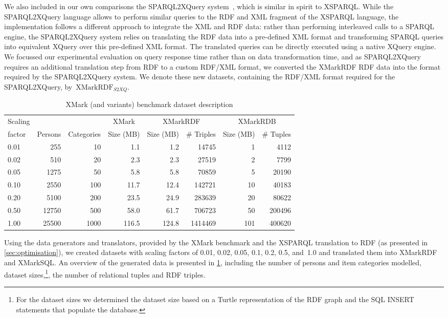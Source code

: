 We also included in our own comparisons the SPAR\-QL2\-XQuery system~\cite{GroppeGroppeLinnemann:2008aa}, which is
similar in spirit to XSPARQL.  While the SPARQL2XQuery language allows to perform similar queries to the \ac{RDF} and
\ac{XML} fragment of the XSPARQL language, the implementation follows a different approach to integrate the \ac{XML} and
\ac{RDF} data: rather than performing interleaved calls to a SPARQL engine, the SPARQL2XQuery system relies on
translating the \ac{RDF} data into a pre-defined \ac{XML} format and transforming SPARQL queries into equivalent XQuery
over this pre-defined \ac{XML} format.  The translated queries can be directly executed using a native XQuery engine.
%
We focussed our experimental evaluation on query response time rather than on data transformation time, and as
SPARQL2XQuery requires an additional translation step from \ac{RDF} to a custom RDF/XML format, we converted the
XMarkRDF \ac{RDF} data into the format required by the SPAR\-QL2\-XQuery system.  We denote these new datasets,
containing the RDF/XML format required for the SPARQL2XQuery, by~$\textrm{XMarkRDF}_{\mathit{S2XQ}}$.


\begin{table}[t]
\caption{XMark (and variants) benchmark dataset description}
\label{tab:iterations}
\centering
\begin{tabular}{p{1.5cm}rr|r|rr|rr}
 \toprule
  Scaling                  &         &            & \multicolumn{1}{c|}{XMark}      & \multicolumn{2}{c|}{XMarkRDF}  & \multicolumn{2}{c}{XMarkRDB} \tabularnewline
   factor & Persons & Categories & Size (MB)  & Size (MB) & \# Triples & Size (MB) & \# Tuples \tabularnewline
 \midrule
  0.01 &   255 &   10 &   1.1 &   1.2 & 14745 & 1 & 4112 \tabularnewline
  0.02 &   510 &   20 &   2.3 &   2.3 & 27519 & 2 & 7799 \tabularnewline
  0.05 &  1275 &   50 &   5.8 &   5.8 & 70859 & 5 & 20190 \tabularnewline
  0.10 &  2550 &  100 &  11.7 &  12.4 & 142721 & 10 & 40183 \tabularnewline
  0.20 &  5100 &  200 &  23.5 &  24.9 & 283639 & 20 & 80622 \tabularnewline
  0.50 & 12750 &  500 &  58.0 &  61.7 & 706723 & 50 & 200496 \tabularnewline
  1.00 & 25500 & 1000 & 116.5 & 124.8 & 1414469 & 101 & 400620\tabularnewline
 \bottomrule
\end{tabular}
\end{table}


Using the data generators and translators, provided by the XMark benchmark and the XSPARQL translation to \ac{RDF} (as
presented in \cref{sec:optimisation}), we created datasets with scaling factors of 0.01, 0.02, 0.05, 0.1, 0.2,
0.5, and~1.0 and translated them into XMarkRDF and XMarkSQL.  An overview of the generated data is presented in
\cref{tab:iterations}, including the number of persons and item categories modelled, dataset sizes,\footnote{For
  the dataset sizes we determined the dataset size based on a Turtle representation of the \ac{RDF} graph and the
  \ac{SQL} \textsf{INSERT} statements that populate the database.}, the number of relational tuples and \ac{RDF}
triples.



